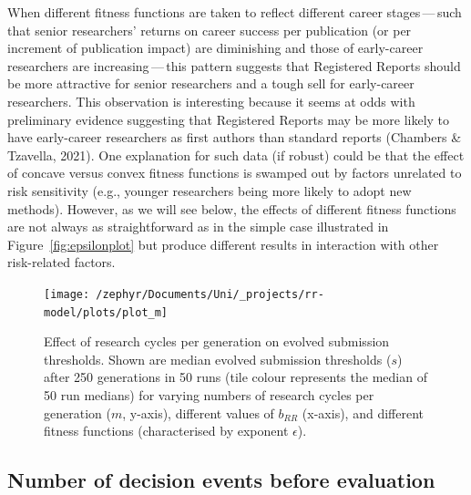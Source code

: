 \documentclass[british,,man,floatsintext]{apa6}
\begin{document}
When different fitness functions are taken to reflect different career stages\(\,\)---\(\,\)such that senior researchers' returns on career success per publication (or per increment of publication impact) are diminishing and those of early-career researchers are increasing\(\,\)---\(\,\)this pattern suggests that Registered Reports should be more attractive for senior researchers and a tough sell for early-career researchers.
This observation is interesting because it seems at odds with preliminary evidence suggesting that Registered Reports may be more likely to have early-career researchers as first authors than standard reports (Chambers \& Tzavella, 2021).
One explanation for such data (if robust) could be that the effect of concave versus convex fitness functions is swamped out by factors unrelated to risk sensitivity (e.g., younger researchers being more likely to adopt new methods).
However, as we will see below, the effects of different fitness functions are not always as straightforward as in the simple case illustrated in Figure~\ref{fig:epsilonplot} but produce different results in interaction with other risk-related factors.



\begin{figure}
\texttt{[image: /zephyr/Documents/Uni/\_projects/rr-model/plots/plot\_m]} \caption{Effect of research cycles per generation on evolved submission thresholds. Shown are median evolved submission thresholds (\(s\)) after 250 generations in 50 runs (tile colour represents the median of 50 run medians) for varying numbers of research cycles per generation (\(m\), y-axis), different values of \(b_{RR}\) (x-axis), and different fitness functions (characterised by exponent \(\epsilon\)).}\label{fig:mplot}
\end{figure}

\hypertarget{number-of-decision-events-before-evaluation-1}{%
\subsection{Number of decision events before evaluation}\label{number-of-decision-events-before-evaluation-1}}
\end{document}
